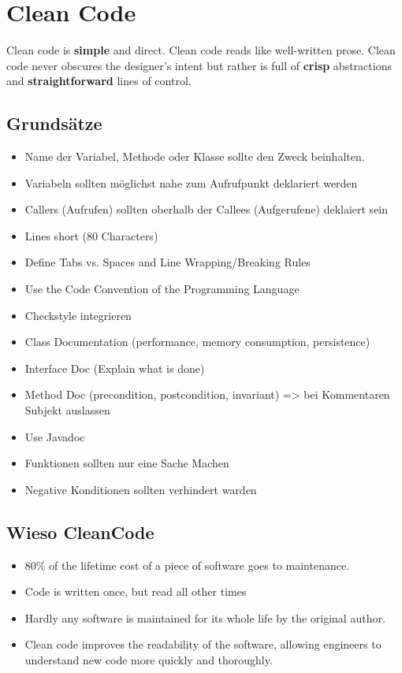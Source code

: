 \documentclass[10pt]{article}
\begin{document}
    \section{Clean Code}
    Clean code is \textbf{simple} and direct. Clean code reads like well-written prose. Clean code never obscures the designer\textquoteright s intent but rather is full of \textbf{crisp} abstractions and \textbf{straightforward} lines of control.

    \subsection{Grunds\"atze}
    \begin{itemize}
        \item Name der Variabel, Methode oder Klasse sollte den Zweck beinhalten.
        \item Variabeln sollten m\"oglichst nahe zum Aufrufpunkt deklariert werden
        \item Callers (Aufrufen) sollten oberhalb der Callees (Aufgerufene) deklaiert sein
        \item Lines short (80 Characters)
        \item Define Tabs vs. Spaces and Line Wrapping/Breaking Rules
        \item Use the Code Convention of the Programming Language
        \item Checkstyle integrieren
        \item Class Documentation (performance, memory consumption, persistence)
        \item Interface Doc (Explain what is done)
        \item Method Doc (precondition, postcondition, invariant) => bei Kommentaren Subjekt auslassen
        \item Use Javadoc
        \item Funktionen sollten nur eine Sache Machen
        \item Negative Konditionen sollten verhindert warden
    \end{itemize}

    \subsection{Wieso CleanCode}
    \begin{itemize}
        \item 80\% of the lifetime cost of a piece of software goes to maintenance.
        \item Code is written once, but read all other times
        \item Hardly any software is maintained for its whole life by the original author.
        \item Clean code improves the readability of the software, allowing engineers to understand new code more quickly and thoroughly.
    \end{itemize}
\end{document}
